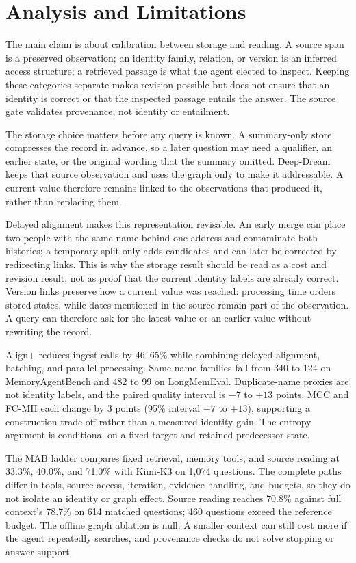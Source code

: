 \section{Analysis and Limitations}
\label{sec:analysis}

The main claim is about calibration between storage and reading. A source span is a preserved observation; an identity family, relation, or version is an inferred access structure; a retrieved passage is what the agent elected to inspect. Keeping these categories separate makes revision possible but does not ensure that an identity is correct or that the inspected passage entails the answer. The source gate validates provenance, not identity or entailment.

The storage choice matters before any query is known. A summary-only store compresses the record in advance, so a later question may need a qualifier, an earlier state, or the original wording that the summary omitted. Deep-Dream keeps that source observation and uses the graph only to make it addressable. A current value therefore remains linked to the observations that produced it, rather than replacing them.

Delayed alignment makes this representation revisable. An early merge can place two people with the same name behind one address and contaminate both histories; a temporary split only adds candidates and can later be corrected by redirecting links. This is why the storage result should be read as a cost and revision result, not as proof that the current identity labels are already correct. Version links preserve how a current value was reached: processing time orders stored states, while dates mentioned in the source remain part of the observation. A query can therefore ask for the latest value or an earlier value without rewriting the record.

Align+ reduces ingest calls by 46--65\% while combining delayed alignment, batching, and parallel processing. Same-name families fall from 340 to 124 on MemoryAgentBench and 482 to 99 on LongMemEval. Duplicate-name proxies are not identity labels, and the paired quality interval is $-7$ to $+13$ points. MCC and FC-MH each change by 3 points (95\% interval $-7$ to $+13$), supporting a construction trade-off rather than a measured identity gain. The entropy argument is conditional on a fixed target and retained predecessor state.

The MAB ladder compares fixed retrieval, memory tools, and source reading at 33.3\%, 40.0\%, and 71.0\% with Kimi-K3 on 1,074 questions. The complete paths differ in tools, source access, iteration, evidence handling, and budgets, so they do not isolate an identity or graph effect. Source reading reaches 70.8\% against full context's 78.7\% on 614 matched questions; 460 questions exceed the reference budget. The offline graph ablation is null. A smaller context can still cost more if the agent repeatedly searches, and provenance checks do not solve stopping or answer support.

